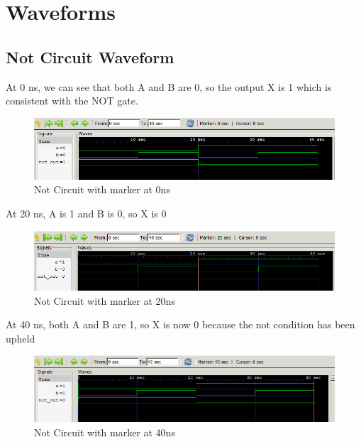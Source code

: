 \documentclass[12pt]{article}
\begin{document}
\section{Waveforms}


\subsection{Not Circuit Waveform}

At 0 ns, we can see that both A and B are 0, so the output X is 1 which is consistent with the NOT gate.
\begin{figure}[h]
    \centering
    \includegraphics[width = 1.0\textwidth]{figs/Not0.png}
    \caption{Not Circuit with marker at 0ns}
    \label{fig:enter-label}
\end{figure}


At 20 ns, A is 1 and B is 0, so X is 0
\begin{figure}[h]
    \centering
    \includegraphics[width = 1.0\textwidth]{figs/Not20.png}
    \caption{Not Circuit with marker at 20ns}
    \label{fig:enter-label}
\end{figure}

\newpage

At 40 ns, both A and B are 1, so X is now 0 because the not condition has been upheld
\begin{figure}[h]
    \centering
    \includegraphics[width = 1.0\textwidth]{figs/Not40.png}
    \caption{Not Circuit with marker at 40ns}
    \label{fig:enter-label}
\end{figure}
\end{document}
